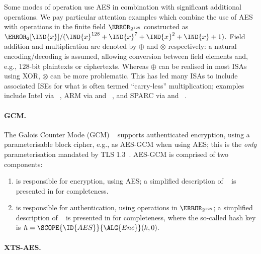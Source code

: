 Some modes of operation use AES in combination with
  significant 
additional operations.  
We pay particular attention examples which combine the use of AES with
operations in the finite field $\F_{2^{128}}$ constructed as
$
\F_{2}[\IND{x}] / ( \IND{x}^{128} + \IND{x}^{7} + \IND{x}^{2} + \IND{x} + 1 ) .
$
Field 
      addition
and
multiplication
are denoted by
$\oplus$
and
$\otimes$
respectively:
a natural encoding/decoding is assumed, allowing conversion between field 
elements and, e.g., $128$-bit plaintexts or ciphertexts.
Whereas $\oplus$ can be realised in most ISAs using XOR, $\otimes$ can be
more problematic.  This has led many ISAs to include associated ISEs for
what is often termed ``carry-less'' multiplication; 
examples include
Intel via ~\cite[Page 4-241]{X86:2:18},
ARM   via  and ~\cite[Section C7.2.215]{ARMv8-A:20},
and
SPARC via  and ~\cite[Section 7.143]{SPARC:16}.

\paragraph{GCM.}

The Galois Counter Mode (GCM)
~\cite{NIST:sp.800.38d}
supports authenticated encryption, using a parameterisable block cipher,
e.g., as AES-GCM when using AES; this is the {\em only} parameterisation
mandated by TLS 1.3~\cite[Section 9.1]{rfc:8446}.
AES-GCM is comprised of two components:

\begin{enumerate}

\item {}
      is responsible for 
          encryption,
      using AES; 
      a simplified description of
      ~\cite[Algorithm 3]{NIST:sp.800.38d}
      is presented in
      for completeness.

\item {}
      is responsible for
      authentication,
      using operations in $\F_{2^{128}}$;
      a simplified description of
      ~\cite[Algorithm 2]{NIST:sp.800.38d}
      is presented in
      for completeness,
      where the so-called hash key is
      $
      h = \SCOPE{\ID{AES}}{\ALG{Enc}}( k, 0 ) .
      $

\end{enumerate}

\paragraph{XTS-AES.}

